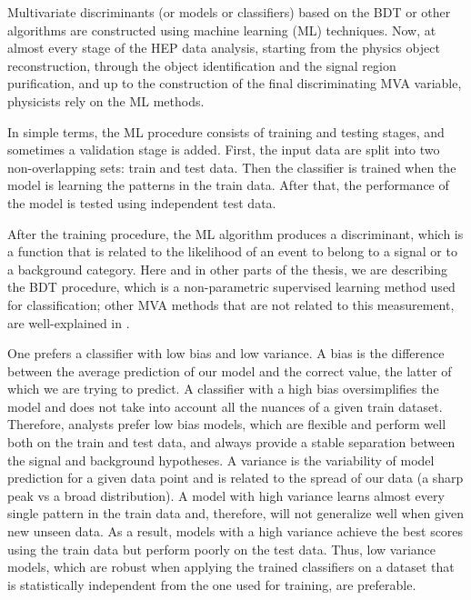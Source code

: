 Multivariate discriminants (or models or classifiers) based on the BDT or other algorithms are constructed using machine learning (ML) techniques. Now, at almost every stage of the HEP data analysis, starting from the physics object reconstruction, through the object identification and the signal region purification, and up to the construction of the final discriminating MVA variable, physicists rely on the ML methods.

In simple terms, the ML procedure consists of training and testing stages, and sometimes a validation stage is added. First, the input data are split into two non-overlapping sets: train and test data. Then the classifier is trained when the model is learning the patterns in the train data. After that, the performance of the model is tested using independent test data. 

After the training procedure, the ML algorithm produces a discriminant, which is a function that is related to the likelihood of an event to belong to a signal or to a background category. Here and in other parts of the thesis, we are describing the BDT procedure, which is a non-parametric supervised learning method used for classification; other MVA methods that are not related to this measurement, are well-explained in \cite{book:411471}. 

One prefers a classifier with low bias and low variance. A bias is the difference between the average prediction of our model and the correct value, the latter of which we are trying to predict. A classifier with a high bias oversimplifies the model and does not take into account all the nuances of a given train dataset. Therefore, analysts prefer low bias models, which are flexible and perform well both on the train and test data, and always provide a stable separation between the signal and background hypotheses. A variance is the variability of model prediction for a given data point and is related to the spread of our data (a sharp peak vs a broad distribution). A model with high variance learns almost every single pattern in the train data and, therefore, will not generalize well when given new unseen data. As a result, models with a high variance achieve the best scores using the train data but perform poorly on the test data. Thus, low variance models, which are robust when applying the trained classifiers on a dataset that is statistically independent from the one used for training, are preferable.

